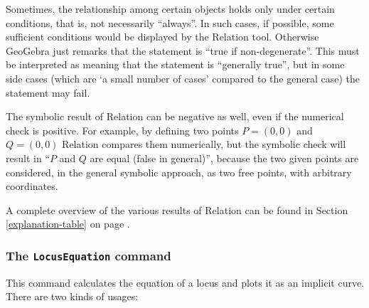 \documentclass{article}
\begin{document}
Sometimes, the relationship among certain objects holds only under certain conditions, that is, not necessarily ``always''. In such cases, if possible, some sufficient conditions would be displayed by the Relation tool. Otherwise GeoGebra just remarks that the statement is ``true if non-degenerate''. This must be interpreted as meaning that the statement is ``generally true'', but in some side cases (which are `a small number of cases' compared to the general case) the statement may fail.

The symbolic result of Relation can be negative as well, even if the numerical check is positive. For example, by defining two points $P=(0,0)$ and $Q=(0,0)$ Relation compares them numerically, but the symbolic check will result in ``$P$ and $Q$ are equal (false in general)'', because the two given points are considered, in the general symbolic approach, as two free points, with arbitrary coordinates.

A complete overview of the various results of Relation can be found in Section \ref{explanation-table} on page \pageref{explanation-table}.

\subsubsection{The \texttt{LocusEquation} command}

This command calculates the equation of a locus and plots it as an implicit curve. There are two kinds of usages:
\end{document}
